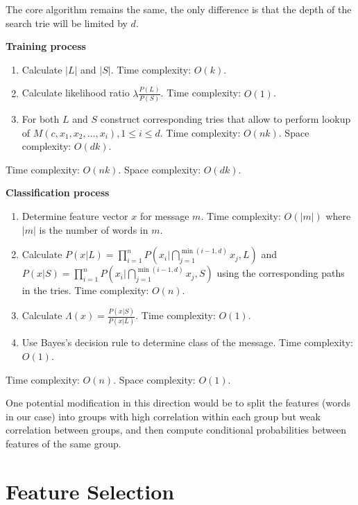 \documentclass[12pt]{report}
\begin{document}
The core algorithm remains the same, the only difference is that the depth of the search trie will be limited by $d$.

\textbf{Training process}

\begin{enumerate}
	\item Calculate $|L|$ and $|S|$. Time complexity: $O(k)$.
	\item Calculate likelihood ratio $\lambda \frac{P(L)}{P(S)}$. Time complexity: $O(1)$.
	\item For both $L$ and $S$ construct corresponding tries that allow to perform lookup of $M(c, x_1, x_2, \dots, x_i), 1 \le i \le d$. Time complexity: $O(nk)$. Space complexity: $O(dk)$.
\end{enumerate}

Time complexity: $O(nk)$. Space complexity: $O(dk)$.

\textbf{Classification process}

\begin{enumerate}
	\item Determine feature vector $x$ for message $m$. Time complexity: $O(|m|)$ where $|m|$ is the number of words in $m$.
	\item Calculate $P(x | L) = \prod_{i=1}^{n} P(x_i | \bigcap_{j = 1}^{\min(i - 1, d)} x_j, L)$ and $P(x | S) = \prod_{i=1}^{n} P(x_i | \bigcap_{j = 1}^{\min(i - 1, d)} x_j, S)$ using the corresponding paths in the tries. Time complexity: $O(n)$.
	\item Calculate $\Lambda(x) = \frac{P(x | S)}{P(x | L)}$. Time complexity: $O(1)$.
	\item Use Bayes's decision rule to determine class of the message. Time complexity: $O(1)$.
\end{enumerate}

Time complexity: $O(n)$. Space complexity: $O(1)$.

One potential modification in this direction would be to split the features (words in our case) into groups with high correlation within each group but weak correlation between groups, and then compute conditional probabilities between features of the same group.

\newpage


\chapter{Feature Selection}
\end{document}
